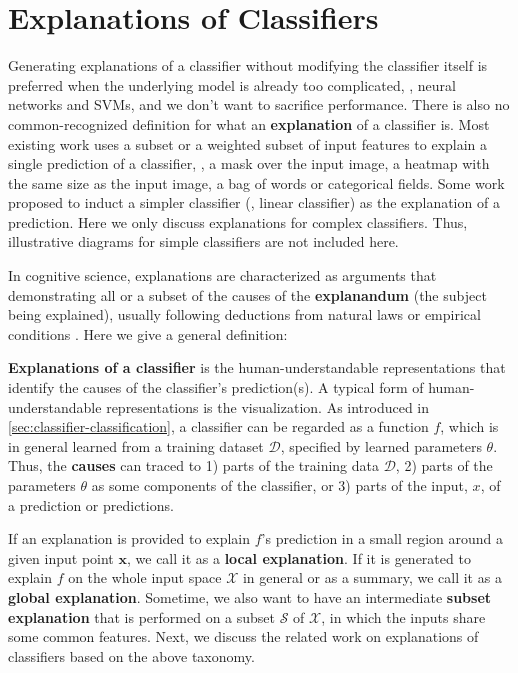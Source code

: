 \section{Explanations of Classifiers}

Generating explanations of a classifier without modifying the classifier itself is preferred when the underlying model is already too complicated, \eg, neural networks and SVMs, and we don't want to sacrifice performance. There is also no common-recognized definition for what an \textbf{explanation} of a classifier is. Most existing work uses a subset or a weighted subset of input features to explain a single prediction of a classifier, \eg, a mask over the input image, a heatmap with the same size as the input image, a bag of words or categorical fields. Some work \cite{ribeiro2016kdd} proposed to induct a simpler classifier (\eg, linear classifier) as the explanation of a prediction. Here we only discuss explanations for complex classifiers. Thus, illustrative diagrams for simple classifiers are not included here.

In cognitive science, explanations are characterized as arguments that demonstrating all or a subset of the causes of the \textbf{explanandum} (the subject being explained), usually following deductions from natural laws or empirical conditions \cite{hempel1948explanation,lombrozo2006explanation}. Here we give a general definition: 

\textbf{Explanations of a classifier} is the human-understandable representations that identify the causes of the classifier's prediction(s). A typical form of human-understandable representations is the visualization. As introduced in \autoref{sec:classifier-classification}, a classifier can be regarded as a function $f$, which is in general learned from a training dataset $\mathcal{D}$, specified by learned parameters $\theta$. Thus, the \textbf{causes} can traced to 1) parts of the training data $\mathcal{D}$, 2) parts of the parameters $\theta$ as some components of the classifier, or 3) parts of the input, $x$, of a prediction or predictions. 

If an explanation is provided to explain $f$'s prediction in a small region around a given input point $\mathbf{x}$, we call it as a \textbf{local explanation}. If it is generated to explain $f$ on the whole input space $\mathcal{X}$ in general or as a summary, we call it as a \textbf{global explanation}. Sometime, we also want to have an intermediate \textbf{subset explanation} that is performed on a subset $\mathcal{S}$ of $\mathcal{X}$, in which the inputs share some common features. 
Next, we discuss the related work on explanations of classifiers based on the above taxonomy. 

